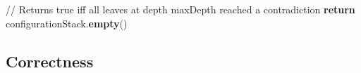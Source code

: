 \begin{algorithm}
\begin{algorithmic}[1]
          \State // Returns true iff all leaves at depth maxDepth reached a contradiction
          \State \textbf{return} configurationStack.\textbf{empty}()
          \EndProcedure

  \end{algorithmic}
\end{algorithm}


\subsection{Correctness}